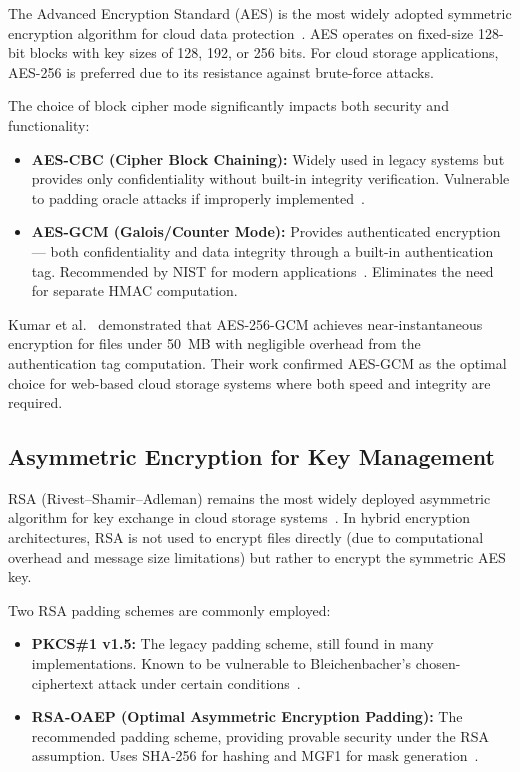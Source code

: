 \documentclass[conference]{IEEEtran}
\begin{document}
The Advanced Encryption Standard (AES) is the most widely adopted symmetric encryption algorithm for cloud data protection~\cite{daemen2002design}. AES operates on fixed-size 128-bit blocks with key sizes of 128, 192, or 256 bits. For cloud storage applications, AES-256 is preferred due to its resistance against brute-force attacks.

The choice of block cipher mode significantly impacts both security and functionality:

\begin{itemize}
    \item \textbf{AES-CBC (Cipher Block Chaining):} Widely used in legacy systems but provides only confidentiality without built-in integrity verification. Vulnerable to padding oracle attacks if improperly implemented~\cite{vaudenay2002security}.
    \item \textbf{AES-GCM (Galois/Counter Mode):} Provides authenticated encryption --- both confidentiality and data integrity through a built-in authentication tag. Recommended by NIST for modern applications~\cite{dworkin2007recommendation}. Eliminates the need for separate HMAC computation.
\end{itemize}

Kumar et al.~\cite{kumar2024hybrid} demonstrated that AES-256-GCM achieves near-instantaneous encryption for files under 50~MB with negligible overhead from the authentication tag computation. Their work confirmed AES-GCM as the optimal choice for web-based cloud storage systems where both speed and integrity are required.

\subsection{Asymmetric Encryption for Key Management}

RSA (Rivest--Shamir--Adleman) remains the most widely deployed asymmetric algorithm for key exchange in cloud storage systems~\cite{rivest1978method}. In hybrid encryption architectures, RSA is not used to encrypt files directly (due to computational overhead and message size limitations) but rather to encrypt the symmetric AES key.

Two RSA padding schemes are commonly employed:

\begin{itemize}
    \item \textbf{PKCS\#1 v1.5:} The legacy padding scheme, still found in many implementations. Known to be vulnerable to Bleichenbacher's chosen-ciphertext attack under certain conditions~\cite{bleichenbacher1998chosen}.
    \item \textbf{RSA-OAEP (Optimal Asymmetric Encryption Padding):} The recommended padding scheme, providing provable security under the RSA assumption. Uses SHA-256 for hashing and MGF1 for mask generation~\cite{bellare1994optimal}.
\end{itemize}
\end{document}
